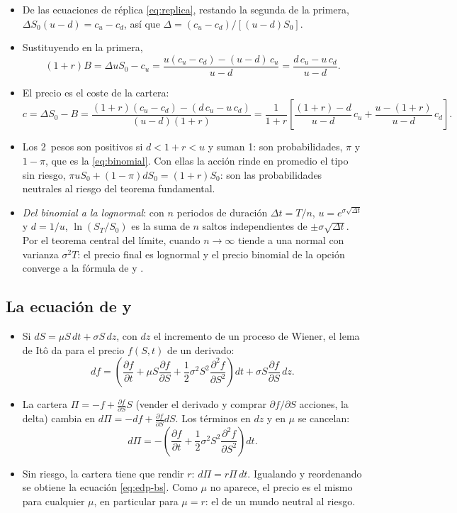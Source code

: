 \documentclass[11pt]{article}
\begin{document}
\begin{itemize}
\item De las ecuaciones de réplica \eqref{eq:replica}, restando la segunda de la primera, $\Delta S_0(u-d)=c_u-c_d$, así que $\Delta=(c_u-c_d)/[(u-d)S_0]$.
\item Sustituyendo en la primera,
  \[
  (1+r)B=\Delta uS_0-c_u=\frac{u(c_u-c_d)-(u-d)\,c_u}{u-d}=\frac{d\,c_u-u\,c_d}{u-d}.
  \]
\item El precio es el coste de la cartera:
  \[
  c=\Delta S_0-B=\frac{(1+r)(c_u-c_d)-(d\,c_u-u\,c_d)}{(u-d)(1+r)}=\frac{1}{1+r}\left[\frac{(1+r)-d}{u-d}\,c_u+\frac{u-(1+r)}{u-d}\,c_d\right].
  \]
\item Los 2~pesos son positivos si $d<1+r<u$ y suman 1: son probabilidades, $\pi$ y $1-\pi$, que es la \eqref{eq:binomial}. Con ellas la acción rinde en promedio el tipo sin riesgo, $\pi uS_0+(1-\pi)dS_0=(1+r)S_0$: son las probabilidades neutrales al riesgo del teorema fundamental. \findemo
\item \emph{Del binomial a la lognormal}: con $n$ periodos de duración $\Delta t=T/n$, $u=e^{\sigma\sqrt{\Delta t}}$ y $d=1/u$\nocite{CoxRossRubinstein1979Option}, $\ln(S_T/S_0)$ es la suma de $n$ saltos independientes de $\pm\sigma\sqrt{\Delta t}$. Por el teorema central del límite, cuando $n\to\infty$ tiende a una normal con varianza $\sigma^2T$: el precio final es lognormal y el precio binomial de la opción converge a la fórmula de  y .
\end{itemize}

\subsection{La ecuación de  y }

\begin{itemize}
\item Si $dS=\mu S\,dt+\sigma S\,dz$, con $dz$ el incremento de un proceso de Wiener, el lema de Itô da para el precio $f(S,t)$ de un derivado:
  \[
  df=\left(\frac{\partial f}{\partial t}+\mu S\frac{\partial f}{\partial S}+\frac12\sigma^2S^2\frac{\partial^2f}{\partial S^2}\right)dt+\sigma S\frac{\partial f}{\partial S}\,dz.
  \]
\item La cartera $\Pi=-f+\frac{\partial f}{\partial S}S$ (vender el derivado y comprar $\partial f/\partial S$ acciones, la delta) cambia en $d\Pi=-df+\frac{\partial f}{\partial S}dS$. Los términos en $dz$ y en $\mu$ se cancelan:
  \[
  d\Pi=-\left(\frac{\partial f}{\partial t}+\frac12\sigma^2S^2\frac{\partial^2f}{\partial S^2}\right)dt.
  \]
\item Sin riesgo, la cartera tiene que rendir $r$: $d\Pi=r\Pi\,dt$. Igualando y reordenando se obtiene la ecuación \eqref{eq:edp-bs}. Como $\mu$ no aparece, el precio es el mismo para cualquier $\mu$, en particular para $\mu=r$: el de un mundo neutral al riesgo. \findemo
\end{itemize}
\end{document}
